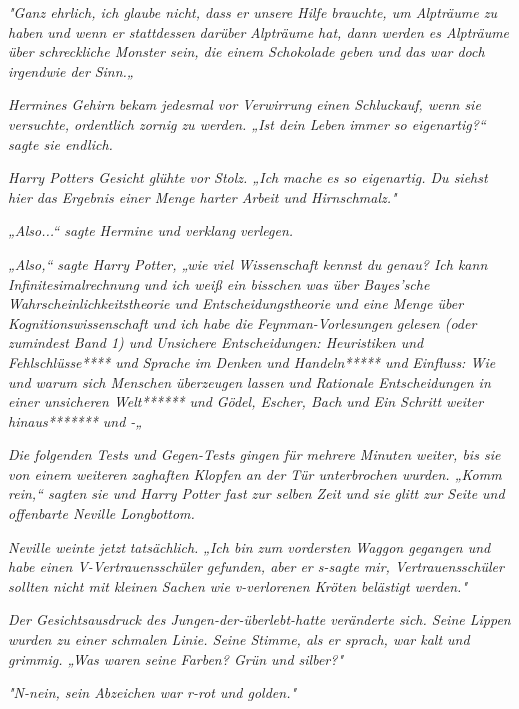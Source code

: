 {\emph{"Ganz ehrlich, ich glaube nicht, dass er unsere Hilfe brauchte, um Alpträume zu haben und wenn er stattdessen} \emph{\emph{darüber}} \emph{Alpträume hat, dann werden es Alpträume über schreckliche Monster sein, die einem Schokolade geben und das war doch irgendwie der} \emph{\emph{Sinn.}„}

\emph{Hermines Gehirn bekam jedesmal vor Verwirrung einen Schluckauf, wenn sie versuchte, ordentlich zornig zu werden. „Ist dein Leben immer so eigenartig?“ sagte sie endlich.}

\emph{Harry Potters Gesicht glühte vor Stolz. „Ich} \emph{\emph{mache}} \emph{es so eigenartig. Du siehst hier das Ergebnis einer Menge harter Arbeit und Hirnschmalz."}

\emph{„Also...“ sagte Hermine und verklang} \emph{verlegen.}

\emph{„Also,“ sagte Harry Potter, „wie viel Wissenschaft kennst du genau? Ich kann Infinitesimalrechnung und ich weiß ein bisschen was über Bayes'sche Wahrscheinlichkeitstheorie und Entscheidungstheorie und eine Menge über Kognitionswissenschaft und ich habe die} \emph{\emph{Feynman-Vorlesungen}} \emph{gelesen (oder zumindest Band 1) und} \emph{\emph{Unsichere Entscheidungen: Heuristiken und Fehl}\emph{schlüsse}**** und} \emph{\emph{Sprache im Denken und Handeln}***** und} \emph{\emph{Einfluss: Wie und warum sich Menschen überzeugen lassen}} \emph{und} \emph{\emph{Rationale Entscheidungen in einer unsicheren Welt}****** und} \emph{\emph{Gödel, Escher, Bach}} \emph{und} \emph{\emph{Ein Schritt weiter hinaus}******* und -„}

\emph{Die folgenden Tests und Gegen-Tests gingen für mehrere Minuten weiter, bis sie von einem weiteren zaghaften Klopfen an der Tür unterbrochen wurden. „Komm rein,“ sagten sie und Harry Potter fast zur selben Zeit und sie glitt zur Seite und offenbarte Neville Longbottom.}

\emph{Neville weinte jetzt} \emph{\emph{tatsächlich.}} \emph{„Ich bin zum vordersten Waggon gegangen und habe einen V-Vertrauensschüler gefunden, aber er s-sagte mir, Vertrauensschüler sollten nicht mit kleinen Sachen wie v-verlorenen Kröten belästigt werden."}

\emph{Der Gesichtsausdruck des Jungen-der-überlebt-hatte veränderte sich. Seine Lippen wurden zu einer schmalen Linie. Seine Stimme, als er sprach, war kalt und grimmig. „Was waren seine Farben? Grün und silber?"}

\emph{"N-nein, sein Abzeichen war r-rot und golden."}

}
